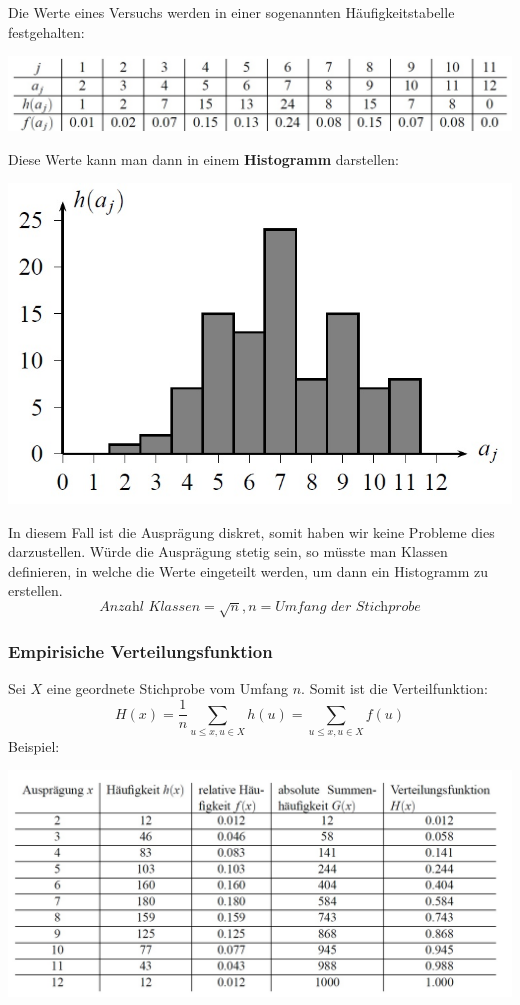 \documentclass[12pt,a4paper]{article} %
\begin{document}
Die Werte eines Versuchs werden in einer sogenannten Häufigkeitstabelle festgehalten:
\begin{center}
\includegraphics[scale=0.5]{haeufig.jpg}
\end{center}
Diese Werte kann man dann in einem \textbf{Histogramm} darstellen:
\begin{center}
\includegraphics[scale=0.5]{histogramm.jpg}
\end{center}
In diesem Fall ist die Ausprägung diskret, somit haben wir keine Probleme dies darzustellen. Würde die Ausprägung stetig sein, so müsste man Klassen definieren, in welche die Werte eingeteilt werden, um dann ein Histogramm zu erstellen.
$$\textit{Anzahl Klassen} = \sqrt{n}, n = \textit{Umfang der Stichprobe}$$
\pagebreak
\subsubsection{Empirisiche Verteilungsfunktion}
Sei $X$ eine geordnete Stichprobe vom Umfang $n$. Somit ist die Verteilfunktion: 
$$H(x) = \frac{1}{n} \sum_{u \le x, u \in X} h(u) = \sum_{u \le x, u \in X} f(u)$$
Beispiel:
\begin{center}
\includegraphics[scale=0.5]{verteilfunktion.jpg}
\end{center}
\end{document}
